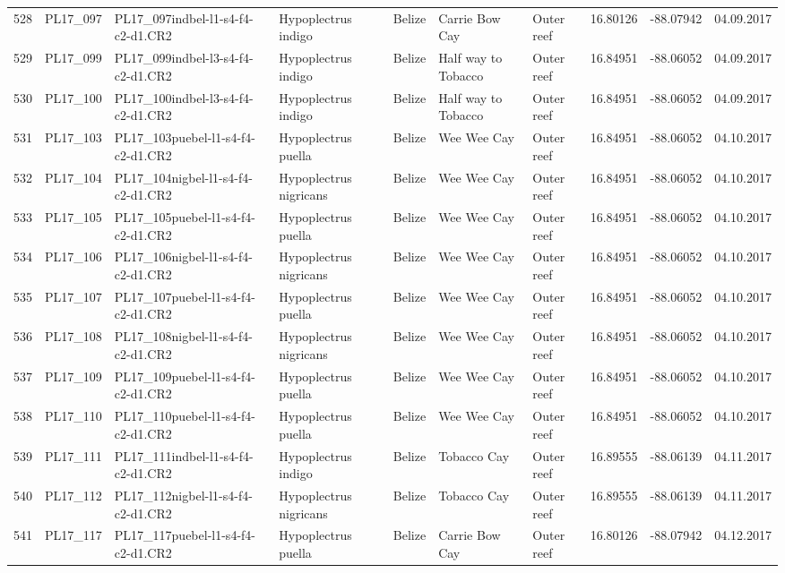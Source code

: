 \begin{table}[ht]
\begin{tabular}{rlllllllll}
  528 & PL17\_097 & PL17\_097indbel-l1-s4-f4-c2-d1.CR2 & Hypoplectrus indigo & Belize & Carrie Bow Cay & Outer reef & 16.80126 & -88.07942 & 04.09.2017 \\ 
  529 & PL17\_099 & PL17\_099indbel-l3-s4-f4-c2-d1.CR2 & Hypoplectrus indigo & Belize & Half way to Tobacco & Outer reef & 16.84951 & -88.06052 & 04.09.2017 \\ 
  530 & PL17\_100 & PL17\_100indbel-l3-s4-f4-c2-d1.CR2 & Hypoplectrus indigo & Belize & Half way to Tobacco & Outer reef & 16.84951 & -88.06052 & 04.09.2017 \\ 
  531 & PL17\_103 & PL17\_103puebel-l1-s4-f4-c2-d1.CR2 & Hypoplectrus puella & Belize & Wee Wee Cay & Outer reef & 16.84951 & -88.06052 & 04.10.2017 \\ 
  532 & PL17\_104 & PL17\_104nigbel-l1-s4-f4-c2-d1.CR2 & Hypoplectrus nigricans & Belize & Wee Wee Cay & Outer reef & 16.84951 & -88.06052 & 04.10.2017 \\ 
  533 & PL17\_105 & PL17\_105puebel-l1-s4-f4-c2-d1.CR2 & Hypoplectrus puella & Belize & Wee Wee Cay & Outer reef & 16.84951 & -88.06052 & 04.10.2017 \\ 
  534 & PL17\_106 & PL17\_106nigbel-l1-s4-f4-c2-d1.CR2 & Hypoplectrus nigricans & Belize & Wee Wee Cay & Outer reef & 16.84951 & -88.06052 & 04.10.2017 \\ 
  535 & PL17\_107 & PL17\_107puebel-l1-s4-f4-c2-d1.CR2 & Hypoplectrus puella & Belize & Wee Wee Cay & Outer reef & 16.84951 & -88.06052 & 04.10.2017 \\ 
  536 & PL17\_108 & PL17\_108nigbel-l1-s4-f4-c2-d1.CR2 & Hypoplectrus nigricans & Belize & Wee Wee Cay & Outer reef & 16.84951 & -88.06052 & 04.10.2017 \\ 
  537 & PL17\_109 & PL17\_109puebel-l1-s4-f4-c2-d1.CR2 & Hypoplectrus puella & Belize & Wee Wee Cay & Outer reef & 16.84951 & -88.06052 & 04.10.2017 \\ 
  538 & PL17\_110 & PL17\_110puebel-l1-s4-f4-c2-d1.CR2 & Hypoplectrus puella & Belize & Wee Wee Cay & Outer reef & 16.84951 & -88.06052 & 04.10.2017 \\ 
  539 & PL17\_111 & PL17\_111indbel-l1-s4-f4-c2-d1.CR2 & Hypoplectrus indigo & Belize & Tobacco Cay & Outer reef & 16.89555 & -88.06139 & 04.11.2017 \\ 
  540 & PL17\_112 & PL17\_112nigbel-l1-s4-f4-c2-d1.CR2 & Hypoplectrus nigricans & Belize & Tobacco Cay & Outer reef & 16.89555 & -88.06139 & 04.11.2017 \\ 
  541 & PL17\_117 & PL17\_117puebel-l1-s4-f4-c2-d1.CR2 & Hypoplectrus puella & Belize & Carrie Bow Cay & Outer reef & 16.80126 & -88.07942 & 04.12.2017 \\ 

\end{tabular}
\end{table}
